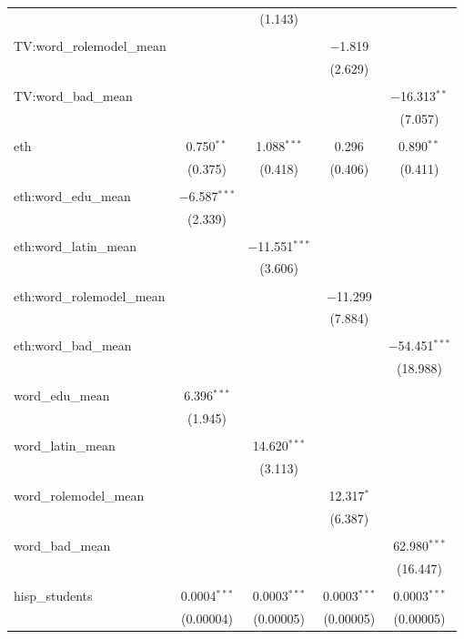 \begin{table}[!htbp]
\begin{tabular}{@{\extracolsep{-2pt}}lcccc}
  &  & (1.143) &  &  \\ 
  & & & & \\ 
 TV:word\_rolemodel\_mean &  &  & $-$1.819 &  \\ 
  &  &  & (2.629) &  \\ 
  & & & & \\ 
 TV:word\_bad\_mean &  &  &  & $-$16.313$^{**}$ \\ 
  &  &  &  & (7.057) \\ 
  & & & & \\ 
 eth & 0.750$^{**}$ & 1.088$^{***}$ & 0.296 & 0.890$^{**}$ \\ 
  & (0.375) & (0.418) & (0.406) & (0.411) \\ 
  & & & & \\ 
 eth:word\_edu\_mean & $-$6.587$^{***}$ &  &  &  \\ 
  & (2.339) &  &  &  \\ 
  & & & & \\ 
 eth:word\_latin\_mean &  & $-$11.551$^{***}$ &  &  \\ 
  &  & (3.606) &  &  \\ 
  & & & & \\ 
 eth:word\_rolemodel\_mean &  &  & $-$11.299 &  \\ 
  &  &  & (7.884) &  \\ 
  & & & & \\ 
 eth:word\_bad\_mean &  &  &  & $-$54.451$^{***}$ \\ 
  &  &  &  & (18.988) \\ 
  & & & & \\ 
 word\_edu\_mean & 6.396$^{***}$ &  &  &  \\ 
  & (1.945) &  &  &  \\ 
  & & & & \\ 
 word\_latin\_mean &  & 14.620$^{***}$ &  &  \\ 
  &  & (3.113) &  &  \\ 
  & & & & \\ 
 word\_rolemodel\_mean &  &  & 12.317$^{*}$ &  \\ 
  &  &  & (6.387) &  \\ 
  & & & & \\ 
 word\_bad\_mean &  &  &  & 62.980$^{***}$ \\ 
  &  &  &  & (16.447) \\ 
  & & & & \\ 
 hisp\_students & 0.0004$^{***}$ & 0.0003$^{***}$ & 0.0003$^{***}$ & 0.0003$^{***}$ \\ 
  & (0.00004) & (0.00005) & (0.00005) & (0.00005) \\ 

\end{tabular}
\end{table}
